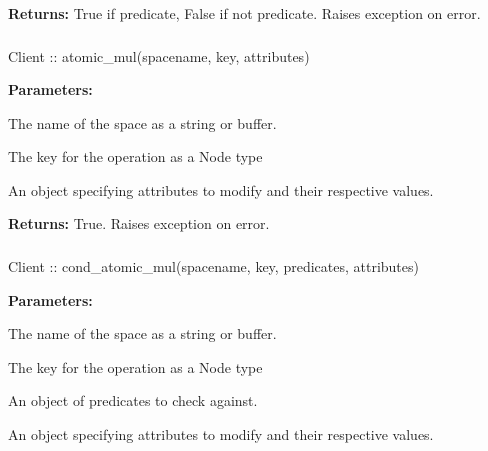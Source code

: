 \noindent\textbf{Returns:}
True if predicate, False if not predicate.  Raises exception on error.

\subsubsection{}
\label{api:nodejs:atomic_mul}
\begin{javascriptcode}
Client :: atomic_mul(spacename, key, attributes)
\end{javascriptcode}


\noindent\textbf{Parameters:}
\begin{description}[labelindent=\widthof{{\code{attributes}}},leftmargin=*,noitemsep,nolistsep,align=right]
\item[\code{spacename}] The name of the space as a string or buffer.
\item[\code{key}] The key for the operation as a Node type
\item[\code{attributes}] An object specifying attributes to modify and their respective values.
\end{description}

\noindent\textbf{Returns:}
True.  Raises exception on error.

\subsubsection{}
\label{api:nodejs:cond_atomic_mul}
\begin{javascriptcode}
Client :: cond_atomic_mul(spacename, key, predicates, attributes)
\end{javascriptcode}


\noindent\textbf{Parameters:}
\begin{description}[labelindent=\widthof{{\code{predicates}}},leftmargin=*,noitemsep,nolistsep,align=right]
\item[\code{spacename}] The name of the space as a string or buffer.
\item[\code{key}] The key for the operation as a Node type
\item[\code{predicates}] An object of predicates to check against.
\item[\code{attributes}] An object specifying attributes to modify and their respective values.
\end{description}

